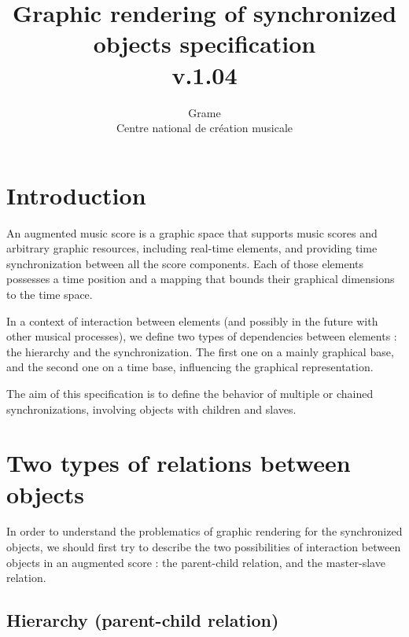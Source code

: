 \documentclass[a4paper]{article}
\begin{document}
\title{Graphic rendering of synchronized objects specification \\ v.1.04}


\author{Grame \\ Centre national de cr\'eation musicale}

\maketitle

\section{Introduction}\label{sec:intro}

An augmented music score is a graphic space that supports music scores and arbitrary graphic resources, including real-time elements, and providing time synchronization between all the score components. Each of those elements possesses a time position and a mapping that bounds their graphical dimensions to the time space.

In a context of interaction between elements (and possibly in the future with other musical processes), we define two types of dependencies between elements : the hierarchy and the synchronization. The first one on a mainly graphical base, and the second one on a time base, influencing the graphical representation.

The aim of this specification is to define the behavior of multiple or chained synchronizations, involving objects with children and slaves.

\section{Two types of relations between objects}\label{sec:relations}

In order to understand the problematics of graphic rendering for the synchronized objects, we should first try to describe the two possibilities of interaction between objects in an augmented score : the parent-child relation, and the master-slave relation. 

\subsection{Hierarchy (parent-child relation)}\label{subsec:hierarchy}
\end{document}
